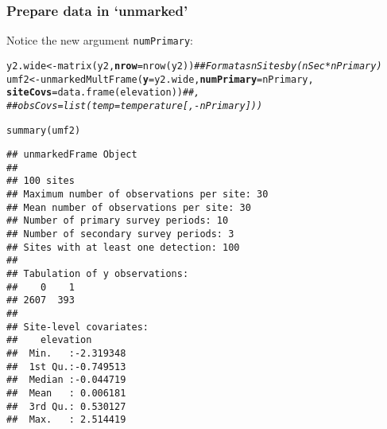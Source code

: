 \documentclass[color=usenames,dvipsnames]{beamer}\usepackage[]{graphicx}\usepackage[]{color}
\makeatletter
\newcommand{\hlcom}[1]{\textcolor[rgb]{0.514,0.506,0.514}{\textit{#1}}}%
\newcommand{\hlstd}[1]{\textcolor[rgb]{0,0,0}{#1}}%
\newcommand{\hlkwb}[1]{\textcolor[rgb]{0,0.341,0.682}{#1}}%
\newcommand{\hlkwc}[1]{\textcolor[rgb]{0,0,0}{\textbf{#1}}}%
\newcommand{\hlkwd}[1]{\textcolor[rgb]{0.004,0.004,0.506}{#1}}%
\newenvironment{kframe}{%
 \def\at@end@of@kframe{}%
 \ifinner\ifhmode%
  \def\at@end@of@kframe{\end{minipage}}%
  \begin{minipage}{\columnwidth}%
 \fi\fi%
 \def\FrameCommand##1{\hskip\@totalleftmargin \hskip-\fboxsep
 \colorbox{shadecolor}{##1}\hskip-\fboxsep
     \hskip-\linewidth \hskip-\@totalleftmargin \hskip\columnwidth}%
 \MakeFramed {\advance\hsize-\width
   \@totalleftmargin\z@ \linewidth\hsize
   \@setminipage}}%
 {\par\unskip\endMakeFramed%
 \at@end@of@kframe}
\newenvironment{knitrout}{}{} %
\newcommand{\inr}[1]{\colorbox{inlinecolor}{\texttt{#1}}}
\makeatother
\begin{document}
\begin{frame}[fragile]
  \frametitle{Prepare data in `unmarked'}
  \small
Notice the new argument \inr{numPrimary}:
\begin{knitrout}\scriptsize
{}\color{fgcolor}\begin{kframe}
\begin{alltt}
\hlstd{y2.wide} \hlkwb{<-} \hlkwd{matrix}\hlstd{(y2,} \hlkwc{nrow}\hlstd{=}\hlkwd{nrow}\hlstd{(y2))} \hlcom{## Format as nSites by (nSec*nPrimary)}
\hlstd{umf2} \hlkwb{<-} \hlkwd{unmarkedMultFrame}\hlstd{(}\hlkwc{y}\hlstd{=y2.wide,} \hlkwc{numPrimary}\hlstd{=nPrimary,}
                          \hlkwc{siteCovs}\hlstd{=}\hlkwd{data.frame}\hlstd{(elevation))}\hlcom{##,}
\hlcom{##                          obsCovs=list(temp=temperature[,-nPrimary]))}
\end{alltt}
\end{kframe}
\end{knitrout}
\pause

\begin{knitrout}\scriptsize
{}\color{fgcolor}\begin{kframe}
\begin{alltt}
\hlkwd{summary}\hlstd{(umf2)}
\end{alltt}
\begin{verbatim}
## unmarkedFrame Object
## 
## 100 sites
## Maximum number of observations per site: 30 
## Mean number of observations per site: 30 
## Number of primary survey periods: 10 
## Number of secondary survey periods: 3 
## Sites with at least one detection: 100 
## 
## Tabulation of y observations:
##    0    1 
## 2607  393 
## 
## Site-level covariates:
##    elevation        
##  Min.   :-2.319348  
##  1st Qu.:-0.749513  
##  Median :-0.044719  
##  Mean   : 0.006181  
##  3rd Qu.: 0.530127  
##  Max.   : 2.514419
\end{verbatim}
\end{kframe}
\end{knitrout}
\end{frame}
\end{document}
